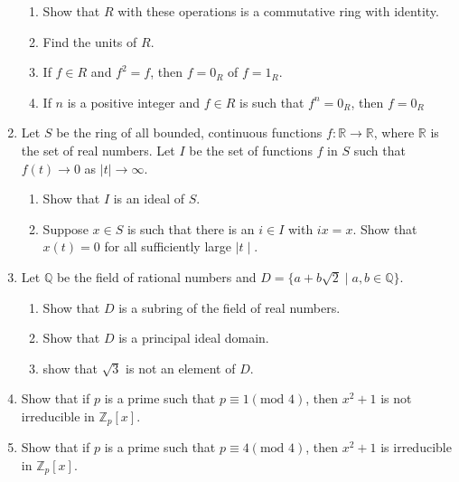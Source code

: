 \documentclass{article}
\theoremstyle{definition}
\newcommand{\m}[1]{(\text{mod }{#1})}
\newcommand{\Z}{\mathbb{Z}}
\newcommand{\R}{\mathbb{R}}
\newcommand{\Q}{\mathbb{Q}}
\begin{document}
\begin{enumerate}
            \begin{enumerate}
                \item Show that $R$ with these operations is a commutative ring with identity.
                \item Find the units of $R$.
                \item If $f\in R$ and $f^2=f$, then $f=0_R$ of $f=1_R$.
                \item If $n$ is a positive integer and $f\in R$ is such that $f^n=0_R$, then $f=0_R$
            \end{enumerate}

            \item Let $S$ be the ring of all bounded, continuous functions $f:\R \to \R$, where $\R$ is the set of real numbers. Let $I$ be the set of functions $f$ in $S$ such that $f(t) \to 0$ as $\mid t\mid  \to \infty $.
            
            \begin{enumerate}
                \item Show that $I$ is an ideal of $S$.
                \item Suppose $x\in S$ is such that there is an $i\in I$ with $ix=x$. Show that $x(t)=0$ for all sufficiently large $\mid t\mid $.
            \end{enumerate}

            \item Let $\Q$ be the field of rational numbers and $D=\{a+b\sqrt{2}\mid a,b\in \Q\}$. 
            
            \begin{enumerate}
                \item Show that $D$ is a subring of the field of real numbers.
                \item Show that $D$ is a principal ideal domain.
                \item show that $\sqrt{3}$ is not an element of $D$.
            \end{enumerate}

            \item Show that if $p$ is a prime such that $p\equiv 1 \m{4}$, then $x^2+1$ is not irreducible in $\Z_p[x]$.
            
            \item Show that if $p$ is a prime such that $p \equiv 4\m{4}$, then $x^2+1$ is irreducible in $\Z_p[x]$.
            

\end{enumerate}
\end{document}
